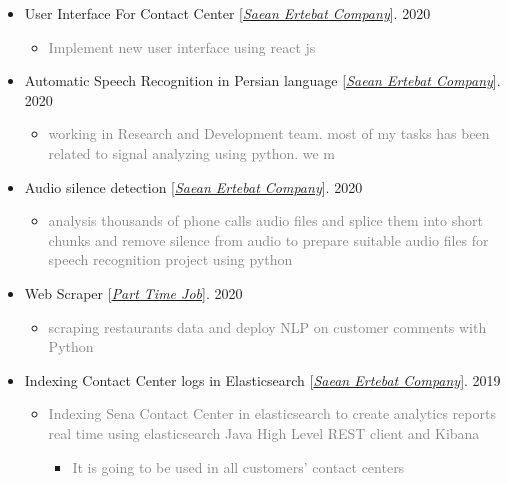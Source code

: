 \documentclass[10pt,a4paper,sans]{moderncv} %
\begin{document}
	\begin{itemize}
		
		\item User Interface For Contact Center [\href{http://www.senatelecom.com/}{\emph{Saean Ertebat Company}}]. \hfill 2020
		\begin{itemize}
			\item \textcolor{gray} {Implement new user interface using react js}
		\end{itemize}

		\item Automatic Speech Recognition in Persian language [\href{http://www.senatelecom.com/}{\emph{Saean Ertebat Company}}]. \hfill 2020
		\begin{itemize}
			\item \textcolor{gray} {working in Research and Development team. most of my tasks has been related to signal analyzing using python. we m}
		\end{itemize}

		\item Audio silence detection [\href{http://www.senatelecom.com/}{\emph{Saean Ertebat Company}}]. \hfill 2020
		\begin{itemize}
			\item \textcolor{gray} {analysis thousands of phone calls audio files and splice them into short chunks and remove silence from audio to prepare suitable audio files for speech recognition project using python}
		\end{itemize}

		\item Web Scraper [\href{mailto:ma.mohammadizadeh@gmail.com}{\emph{Part Time Job}}]. \hfill 2020
		\begin{itemize}
			\item \textcolor{gray} {scraping restaurants data and deploy NLP on customer comments with Python}
		\end{itemize}

		\item Indexing Contact Center logs in Elasticsearch [\href{http://www.senatelecom.com/}{\emph{Saean Ertebat Company}}]. \hfill 2019
		\begin{itemize}
			\item \textcolor{gray} {Indexing Sena Contact Center in elasticsearch to create analytics reports real time using elasticsearch Java High Level REST client and Kibana}
			\begin{itemize}
				\item \textcolor{gray} {It is going to be used in all customers’ contact centers}
			\end{itemize}
		\end{itemize}


\end{itemize}
\end{document}
